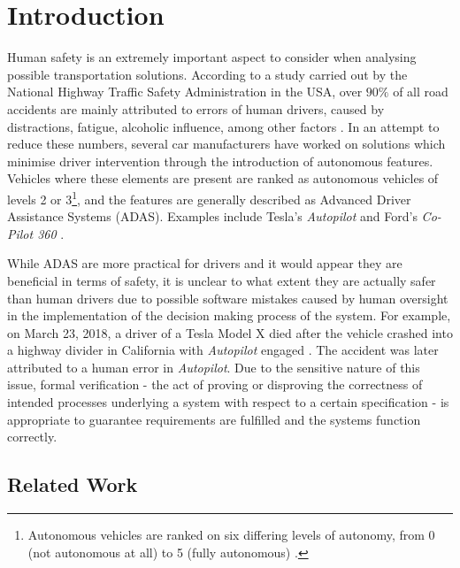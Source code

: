 \chapter{Introduction}

Human safety is an extremely important aspect to consider when analysing possible transportation solutions. According to a study carried out by the National Highway Traffic Safety Administration in the USA, over $90\%$ of all road accidents are mainly attributed to errors of human drivers, caused by distractions, fatigue, alcoholic influence, among other factors \cite{crashes}. In an attempt to reduce these numbers, several car manufacturers have worked on solutions which minimise driver intervention through the introduction of autonomous features. Vehicles where these elements are present are ranked as autonomous vehicles of levels 2 or 3\footnote{Autonomous vehicles are ranked on six differing levels of autonomy, from 0 (not autonomous at all) to 5 (fully autonomous) \cite{wired}.}, and the features are generally described as Advanced Driver Assistance Systems (ADAS). Examples include Tesla's \textit{Autopilot} and Ford's \textit{Co-Pilot 360} \cite{autopilot1, ford}.

While ADAS are more practical for drivers and it would appear they are beneficial in terms of safety, it is unclear to what extent they are actually safer than human drivers due to possible software mistakes caused by human oversight in the implementation of the decision making process of the system. For example, on March 23, 2018, a driver of a Tesla Model X died after the vehicle crashed into a highway divider in California with \textit{Autopilot} engaged \cite{autopilot2}. The accident was later attributed to a human error in \textit{Autopilot}. Due to the sensitive nature of this issue, formal verification - the act of proving or disproving the correctness of intended processes underlying a system with respect to a certain specification \cite{bk08} - is appropriate to guarantee requirements are fulfilled and the systems function correctly. 

\section{Related Work}

